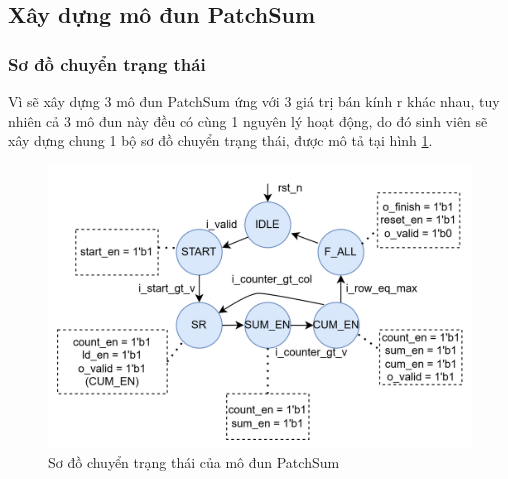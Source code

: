 \subsection{Xây dựng mô đun PatchSum}
\subsubsection{Sơ đồ chuyển trạng thái}
Vì sẽ xây dựng 3 mô đun PatchSum ứng với 3 giá trị bán kính r khác nhau, tuy nhiên cả 3 mô đun này đều có cùng 1 nguyên lý hoạt động, do đó sinh viên sẽ xây dựng chung 1 bộ sơ đồ chuyển trạng thái, được mô tả tại hình \ref{fig:patchSumTrans}. 

\begin{figure}[!ht]
	\centering
	\includegraphics[width=0.8\linewidth]{figures/patchSumTrans.png}
	\caption{Sơ đồ chuyển trạng thái của mô đun PatchSum}
	\label{fig:patchSumTrans}
\end{figure}
